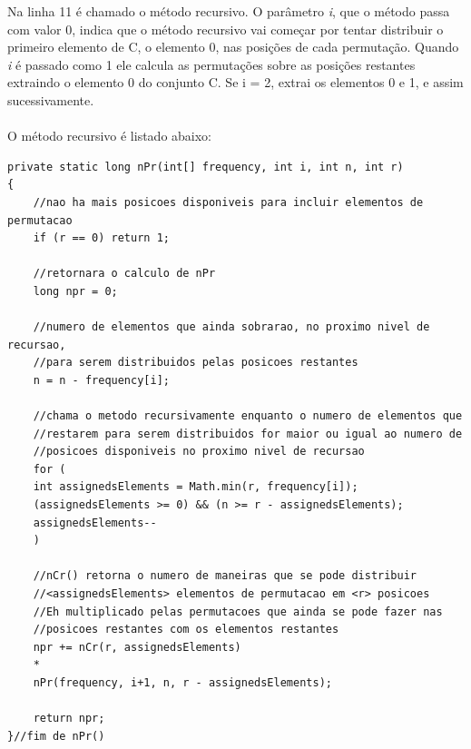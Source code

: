 \documentclass[a4paper,12pt,openany]{book}
\begin{document}
Na linha 11 é chamado o método recursivo. O parâmetro \textit{i}, que o método passa com valor 0, indica que o método recursivo vai começar por tentar distribuir o primeiro elemento de C, o elemento 0, nas posições de cada permutação. Quando \textit{i} é passado como 1 ele calcula as permutações sobre as posições restantes extraindo o elemento 0 do conjunto C. Se i = 2, extrai os elementos 0 e 1, e assim sucessivamente.
\\
\\
O método recursivo é listado abaixo:
\begin{lstlisting}
private static long nPr(int[] frequency, int i, int n, int r)
{ 
	//nao ha mais posicoes disponiveis para incluir elementos de permutacao
	if (r == 0) return 1;
	
	//retornara o calculo de nPr
	long npr = 0;
	
	//numero de elementos que ainda sobrarao, no proximo nivel de recursao,
	//para serem distribuidos pelas posicoes restantes
	n = n - frequency[i]; 
	
	//chama o metodo recursivamente enquanto o numero de elementos que 
	//restarem para serem distribuidos for maior ou igual ao numero de 
	//posicoes disponiveis no proximo nivel de recursao
	for (
	int assignedsElements = Math.min(r, frequency[i]); 
	(assignedsElements >= 0) && (n >= r - assignedsElements);
	assignedsElements--
	)
	
	//nCr() retorna o numero de maneiras que se pode distribuir 
	//<assignedsElements> elementos de permutacao em <r> posicoes
	//Eh multiplicado pelas permutacoes que ainda se pode fazer nas 
	//posicoes restantes com os elementos restantes
	npr += nCr(r, assignedsElements)
	* 
	nPr(frequency, i+1, n, r - assignedsElements);
	
	return npr;
}//fim de nPr()
\end{lstlisting}
\end{document}
